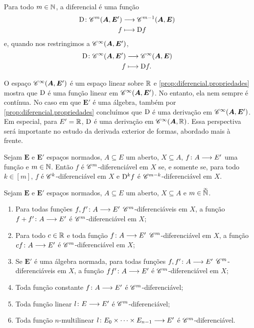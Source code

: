 Para todo $m \in \mathbb{N}$, a diferencial é uma função
	\begin{align*}
	{\mathrm{D}}\colon {\mathscr{C}^{m}(\bm A, \bm E')} &\longrightarrow {\mathscr{C}^{m-1}(\bm A, \bm E)} \\{f} &\longmapsto \mathrm{D} f
	\end{align*}
e, quando nos restringimos a $\mathscr{C}^\infty(\bm A, \bm E')$,
	\begin{align*}
	{\mathrm{D}}\colon {\mathscr{C}^\infty(\bm A, \bm E')} &\longrightarrow {\mathscr{C}^\infty(\bm A, \bm E)} \\{f} &\longmapsto \mathrm{D} f.
	\end{align*}

O espaço $\mathscr{C}^\infty(\bm A, \bm E')$ é um espaço linear sobre $\mathbb{R}$ e \ref{prop:diferencial.propriedades} mostra que $\mathrm{D}$ é uma função linear em $\mathscr{C}^\infty(\bm A, \bm E')$. No entanto, ela nem sempre é contínua. No caso em que $\bm E'$ é uma álgebra, também por \ref{prop:diferencial.propriedades} concluímos que $\mathrm{D}$ é uma derivação em $\mathscr{C}^\infty(\bm A, \bm E')$. Em especial, para $E' = \mathbb{R}$, $\mathrm{D}$ é uma derivação em $\mathscr{C}^\infty(\bm A, \mathbb{R})$. Essa perspectiva será importante no estudo da derivada exterior de formas, abordado mais à frente.

\begin{exercise}
Sejam $\bm E$ e $\bm E'$ espaços normados, $A \subseteq E$ um aberto, $X \subseteq A$, ${f}\colon {A} \longrightarrow {E'}$ uma função e $m \in \mathbb{N}$. Então $f$ é $\mathscr{C}^m$-diferenciável em $X$ se, e somente se, para todo $k \in [m]$, $f$ é $\mathscr{C}^k$-diferenciável em $X$ e $\mathrm{D}^k f$ é $\mathscr{C}^{m-k}$-diferenciável em $X$.
\end{exercise}


\begin{exercise}
\label{prop:multidiferencial.continua.propriedades}
Sejam $\bm E$ e $\bm E'$ espaços normados, $A \subseteq E$ um aberto, $X \subseteq A$ e $m \in \accentset{\infty}{\mathbb{N}}$.
	\begin{enumerate}
	\item Para todas funções ${f,f'}\colon {A} \longrightarrow {E'}$ $\mathscr{C}^m$-diferenciáveis em $X$, a função ${f+f'}\colon {A} \longrightarrow {E'}$ é $\mathscr{C}^m$-diferenciável em $X$;
	\item Para todo $c \in \mathbb{R}$ e toda função ${f}\colon {A} \longrightarrow {E'}$ $\mathscr{C}^m$-diferenciável em $X$, a função ${c f}\colon {A} \longrightarrow {E'}$ é $\mathscr{C}^m$-diferenciável em $X$;
	\item Se $\bm E'$ é uma álgebra normada, para todas funções ${f,f'}\colon {A} \longrightarrow {E'}$ $\mathscr{C}^m$-diferenciáveis em $X$, a função ${f f'}\colon {A} \longrightarrow {E'}$ é $\mathscr{C}^m$-diferenciável em $X$;
	\item Toda função constante ${f}\colon {A} \longrightarrow {E'}$ é $\mathscr{C}^m$-diferenciável;
	\item Toda função linear ${l}\colon {E} \longrightarrow {E'}$ é $\mathscr{C}^m$-diferenciável;
	\item Toda função $n$-multilinear ${l}\colon {E_0 \times \cdots \times E_{n-1}} \longrightarrow {E'}$ é $\mathscr{C}^m$-diferenciável.
	\end{enumerate}
\end{exercise}

